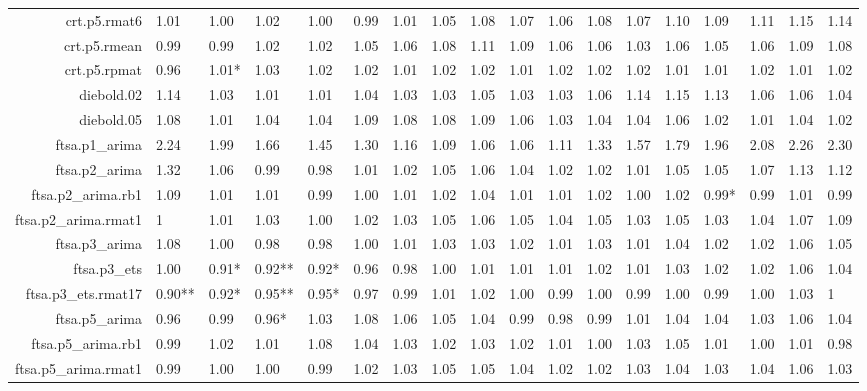 \begin{table}[ht]
{\begin{tabular}{rlllllllllllllllll}
  crt.p5.rmat6 & 1.01 & 1.00 & 1.02 & 1.00 & 0.99 & 1.01 & 1.05 & 1.08 & 1.07 & 1.06 & 1.08 & 1.07 & 1.10 & 1.09 & 1.11 & 1.15 & 1.14 \\ 
  crt.p5.rmean & 0.99 & 0.99 & 1.02 & 1.02 & 1.05 & 1.06 & 1.08 & 1.11 & 1.09 & 1.06 & 1.06 & 1.03 & 1.06 & 1.05 & 1.06 & 1.09 & 1.08 \\ 
  crt.p5.rpmat & 0.96 & 1.01* & 1.03 & 1.02 & 1.02 & 1.01 & 1.02 & 1.02 & 1.01 & 1.02 & 1.02 & 1.02 & 1.01 & 1.01 & 1.02 & 1.01 & 1.02 \\ 
  diebold.02 & 1.14 & 1.03 & 1.01 & 1.01 & 1.04 & 1.03 & 1.03 & 1.05 & 1.03 & 1.03 & 1.06 & 1.14 & 1.15 & 1.13 & 1.06 & 1.06 & 1.04 \\ 
  diebold.05 & 1.08 & 1.01 & 1.04 & 1.04 & 1.09 & 1.08 & 1.08 & 1.09 & 1.06 & 1.03 & 1.04 & 1.04 & 1.06 & 1.02 & 1.01 & 1.04 & 1.02 \\ 
  ftsa.p1\_arima & 2.24 & 1.99 & 1.66 & 1.45 & 1.30 & 1.16 & 1.09 & 1.06 & 1.06 & 1.11 & 1.33 & 1.57 & 1.79 & 1.96 & 2.08 & 2.26 & 2.30 \\ 
  ftsa.p2\_arima & 1.32 & 1.06 & 0.99 & 0.98 & 1.01 & 1.02 & 1.05 & 1.06 & 1.04 & 1.02 & 1.02 & 1.01 & 1.05 & 1.05 & 1.07 & 1.13 & 1.12 \\ 
  ftsa.p2\_arima.rb1 & 1.09 & 1.01 & 1.01 & 0.99 & 1.00 & 1.01 & 1.02 & 1.04 & 1.01 & 1.01 & 1.02 & 1.00 & 1.02 & 0.99* & 0.99 & 1.01 & 0.99 \\ 
  ftsa.p2\_arima.rmat1 & 1 & 1.01 & 1.03 & 1.00 & 1.02 & 1.03 & 1.05 & 1.06 & 1.05 & 1.04 & 1.05 & 1.03 & 1.05 & 1.03 & 1.04 & 1.07 & 1.09 \\ 
  ftsa.p3\_arima & 1.08 & 1.00 & 0.98 & 0.98 & 1.00 & 1.01 & 1.03 & 1.03 & 1.02 & 1.01 & 1.03 & 1.01 & 1.04 & 1.02 & 1.02 & 1.06 & 1.05 \\ 
  ftsa.p3\_ets & 1.00 & 0.91* & 0.92** & 0.92* & 0.96 & 0.98 & 1.00 & 1.01 & 1.01 & 1.01 & 1.02 & 1.01 & 1.03 & 1.02 & 1.02 & 1.06 & 1.04 \\ 
  ftsa.p3\_ets.rmat17 & 0.90** & 0.92* & 0.95** & 0.95* & 0.97 & 0.99 & 1.01 & 1.02 & 1.00 & 0.99 & 1.00 & 0.99 & 1.00 & 0.99 & 1.00 & 1.03 & 1 \\ 
  ftsa.p5\_arima & 0.96 & 0.99 & 0.96* & 1.03 & 1.08 & 1.06 & 1.05 & 1.04 & 0.99 & 0.98 & 0.99 & 1.01 & 1.04 & 1.04 & 1.03 & 1.06 & 1.04 \\ 
  ftsa.p5\_arima.rb1 & 0.99 & 1.02 & 1.01 & 1.08 & 1.04 & 1.03 & 1.02 & 1.03 & 1.02 & 1.01 & 1.00 & 1.03 & 1.05 & 1.01 & 1.00 & 1.01 & 0.98 \\ 
  ftsa.p5\_arima.rmat1 & 0.99 & 1.00 & 1.00 & 0.99 & 1.02 & 1.03 & 1.05 & 1.05 & 1.04 & 1.02 & 1.02 & 1.03 & 1.04 & 1.03 & 1.04 & 1.06 & 1.03 \\ 

\end{tabular}}
\end{table}
